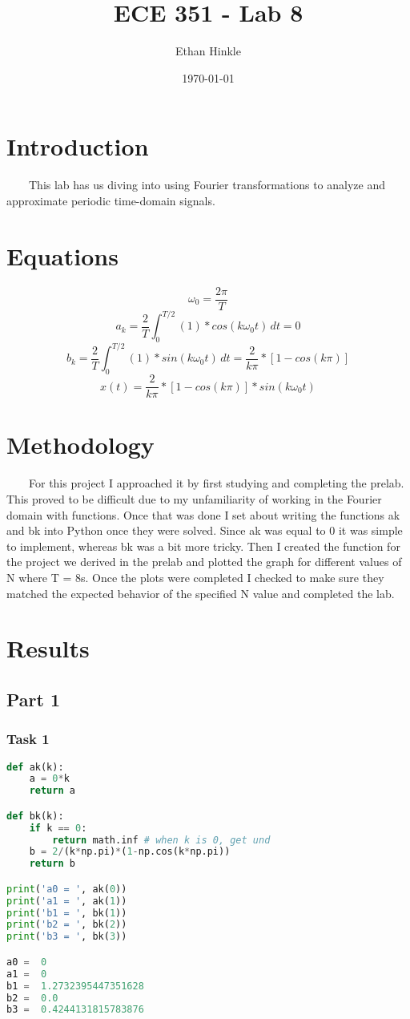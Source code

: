 \documentclass[11pt,a4]{article}
\title{ECE 351 - Lab 8}
\author{Ethan Hinkle}
\date{\today}
\begin{document}
\maketitle

\section{Introduction}
\ \ \ \ This lab has us diving into using Fourier transformations to analyze and approximate periodic time-domain signals.
\section{Equations}

$$\omega_0 = \frac{2\pi}{T}$$
$$a_k = \frac{2}{T} \int_{0}^{T/2} (1) * cos(k\omega_0t) \,dt = 0$$
$$b_k = \frac{2}{T} \int_{0}^{T/2} (1) * sin(k\omega_0t) \,dt = \frac{2}{k\pi} * [1 - cos(k\pi)]$$
$$x(t) =  \frac{2}{k\pi} * [1 - cos(k\pi)] * sin(k\omega_0t)$$

\section{Methodology}
\ \ \ \ For this project I approached it by first studying and completing the prelab. This proved to be difficult due to my unfamiliarity of working in the Fourier domain with functions. Once that was done I set about writing the functions ak and bk into Python once they were solved. Since ak was equal to 0 it was simple to implement, whereas bk was a bit more tricky. Then I created the function for the project we derived in the prelab and plotted the graph for different values of N where T = 8s. Once the plots were completed I checked to make sure they matched the expected behavior of the specified N value and completed the lab.
\section{Results}

\subsection{Part 1}

\subsubsection{Task 1}

\begin{lstlisting}[language=Python]
def ak(k):
    a = 0*k
    return a

def bk(k):
    if k == 0:
        return math.inf # when k is 0, get und
    b = 2/(k*np.pi)*(1-np.cos(k*np.pi))
    return b

print('a0 = ', ak(0))
print('a1 = ', ak(1))
print('b1 = ', bk(1))
print('b2 = ', bk(2))
print('b3 = ', bk(3))

a0 =  0
a1 =  0
b1 =  1.2732395447351628
b2 =  0.0
b3 =  0.4244131815783876
\end{lstlisting}
\end{document}
